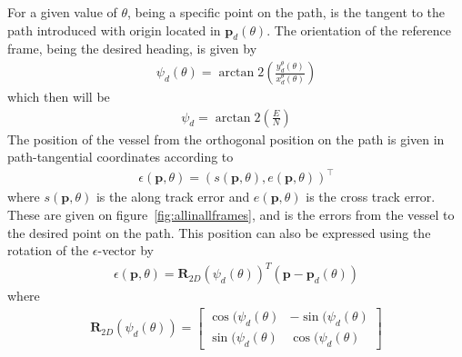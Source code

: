 For a given value of $\theta$, being a specific point on the path, is the tangent to the path introduced with origin located in $\textbf{p}_d(\theta)$. The orientation of the reference frame, being the desired heading, is given by
\begin{align}
\psi_d(\theta) = \arctan2\left(\frac{y_d^\theta(\theta)}{x_d^\theta(\theta)}\right)
\end{align}
which then will be
\begin{align}
\psi_d = \arctan2\left(\frac{E}{N}\right)
\end{align}
The position of the vessel from the orthogonal position on the path is given in path-tangential coordinates according to
\begin{align}
\epsilon(\textbf{p},\theta) = (s(\textbf{p},\theta),e(\textbf{p},\theta))^\top
\end{align}
where $s(\textbf{p},\theta)$ is the along track error and $e(\textbf{p},\theta)$ is the cross track error. These are given on figure~\vref{fig:allinallframes}, and is the errors from the vessel to the desired point on the path. This position can also be expressed using the rotation of the $\epsilon$-vector by
\begin{align}
\epsilon(\textbf{p},\theta) = \textbf{R}_{2D}(\psi_d(\theta))^T(\textbf{p}-\textbf{p}_d(\theta))
\end{align}
where
\begin{align}
\textbf{R}_{2D}(\psi_d(\theta)) = 
\begin{bmatrix}
\cos(\psi_d(\theta) & -\sin(\psi_d(\theta)\\
\sin(\psi_d(\theta) & \cos(\psi_d(\theta)
\end{bmatrix}
\end{align}
